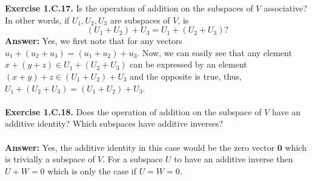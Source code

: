 \documentclass{article}
\begin{document}
	\textbf{Exercise 1.C.17.} Is the operation of addition on the subspaces of $V$ associative? In other words, if $U_1, U_2, U_3$ are subspaces of $V$, is
	$$(U_1 + U_2) + U_3 = U_1 + (U_2 + U_3)?$$
	\textbf{Answer:} Yes, we first note that for any vectors $u_1 + (u_2 + u_3) = (u_1  + u_2) + u_3$. Now, we can easily see that any element $x + (y + z) \in U_1 + (U_2 + U_3)$ can be expressed by an element $(x + y) + z \in (U_1 + U_2) + U_3$ and the opposite is true, thus, $U_1 + (U_2 + U_3) = (U_1 + U_2) + U_3$. \\ \\
	\textbf{Exercise 1.C.18.} Does the operation of addition on the subspace of $V$ have an additive identity? Which subspaces have additive inverses? \\ \\
	\textbf{Answer:} Yes, the additive identity in this case would be the zero vector $\mathbf{0}$ which is trivially a subspace of $V$. For a subspace $U$ to have an additive inverse then $U + W = 0$ which is only the case if $U = W = 0$. \\ \\
\end{document}
